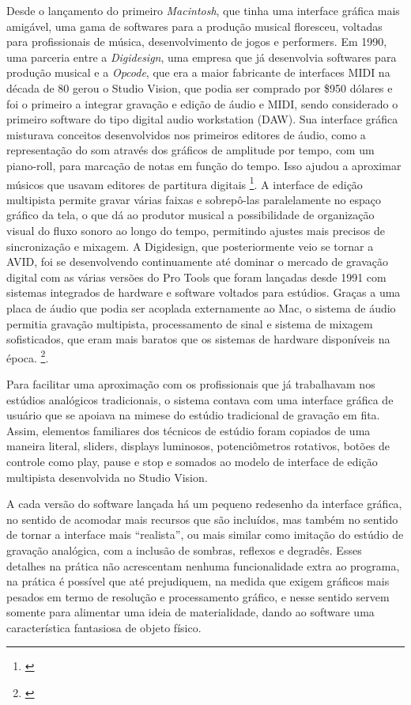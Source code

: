 Desde o lançamento do primeiro \emph{Macintosh}, que tinha uma interface gráfica mais amigável, uma gama de softwares para a produção musical floresceu, voltadas para profissionais de música, desenvolvimento de jogos e performers. Em 1990, uma parceria entre a \emph{Digidesign}, uma empresa que já desenvolvia softwares para produção musical e a \emph{Opcode}, que era a maior fabricante de interfaces MIDI na década de 80 gerou o Studio Vision, que podia ser comprado por \$950 dólares e foi o primeiro a integrar gravação e edição de áudio e MIDI, sendo considerado o primeiro software do tipo digital audio workstation (DAW). Sua interface gráfica misturava conceitos desenvolvidos nos primeiros editores de áudio, como a representação do som através dos gráficos de amplitude por tempo, com um piano-roll, para marcação de notas em função do tempo. Isso ajudou a aproximar músicos que usavam editores de partitura digitais \footnote{\cite{ChrisHalaby2011}}. A interface de edição multipista permite gravar várias faixas e sobrepô-las paralelamente no espaço gráfico da tela, o que dá ao produtor musical a possibilidade de organização visual do fluxo sonoro ao longo do tempo, permitindo ajustes mais precisos de sincronização e mixagem. A Digidesign, que posteriormente veio se tornar a AVID, foi se desenvolvendo continuamente até dominar o mercado de gravação digital com as várias versões do Pro Tools que foram lançadas desde 1991 com sistemas integrados de hardware e software voltados para estúdios. Graças a uma placa de áudio que podia ser acoplada externamente ao Mac, o sistema de áudio permitia gravação multipista, processamento de sinal e sistema de mixagem sofisticados, que eram mais baratos que os sistemas de hardware disponíveis na época. \footnote{\cite{ChrisHalaby2011}}.

Para facilitar uma aproximação com os profissionais que já trabalhavam nos estúdios analógicos tradicionais, o sistema contava com uma interface gráfica de usuário que se apoiava na mimese do estúdio tradicional de gravação em fita. Assim, elementos familiares dos técnicos de estúdio foram copiados de uma maneira literal, sliders, displays luminosos, potenciômetros rotativos, botões de controle como play, pause e stop e somados ao modelo de interface de edição multipista desenvolvida no Studio Vision. 

A cada versão do software lançada há um pequeno redesenho da interface gráfica, no sentido de acomodar mais recursos que são incluídos, mas também no sentido de tornar a interface mais “realista”, ou mais similar como imitação do estúdio de gravação analógica, com a inclusão de sombras, reflexos e degradês. Esses detalhes na prática não acrescentam nenhuma funcionalidade extra ao programa, na prática é possível que até prejudiquem, na medida que exigem gráficos mais pesados em termo de resolução e processamento gráfico, e nesse sentido servem somente para alimentar uma ideia de materialidade, dando ao software uma característica fantasiosa de objeto físico. 

